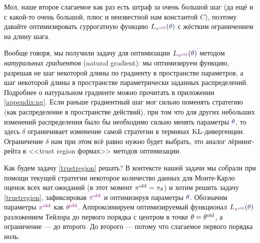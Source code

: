 Мол, наше второе слагаемое как раз есть штраф за очень большой шаг (да ещё и с какой-то очень большой, плюс и неизвестной нам константой $C$), поэтому давайте оптимизировать суррогатную функцию $L_{\textcolor{ChadPurple}{\pi^{\old}}}(\textcolor{ChadBlue}{\theta})$ с жёстким ограничением на длину шага.

Вообще говоря, мы получили задачу для оптимизации $L_{\textcolor{ChadPurple}{\pi^{\old}}}(\textcolor{ChadBlue}{\theta})$ методом \emph{натуральных градиентов} (natural gradient): мы оптимизируем функцию, разрешая не шаг некоторой длины по градиенту в пространстве параметров, а шаг некоторой длины в пространстве параметрически заданных распределений. Подробнее о натуральном градиенте можно прочитать в приложении \ref{appendix:ng}. Если раньше градиентный шаг мог сильно поменять стратегию (как распределение в пространстве действий), при том что для других небольших изменений распределения было бы необходимо сильно менять параметры $\textcolor{ChadBlue}{\theta}$, то здесь $\delta$ ограничивает изменение самой стратегии в терминах $\operatorname{KL}$-дивергенции. Ограничение $\delta$ нам при этом всё равно нужно будет выбрать, это аналог лёрнинг-рейта в <<trust region формах>> методов оптимизации.

Как будем задачу \eqref{trustregion} решать? В контексте нашей задачи мы собрали при помощи текущей стратегии некоторое количество данных для Монте-Карло оценок всех мат.ожиданий (в этот момент $\pi^{\old} \HM= \pi_\theta$) и хотим решить задачу \eqref{trustregion}, зафиксировав $\textcolor{ChadPurple}{\pi^{\old}}$ и оптимизируя параметры $\textcolor{ChadBlue}{\theta}$. Обозначим параметры $\textcolor{ChadPurple}{\pi^{\old}}$ как $\textcolor{ChadPurple}{\theta^{\old}}$. Аппроксимируем оптимизируемый функционал $L_{\textcolor{ChadPurple}{\pi^{\old}}}(\textcolor{ChadBlue}{\theta})$ разложением Тейлора до первого порядка с центром в точке $\theta = \theta^{\mathrm{old}}$, а ограничение --- до второго. До второго --- потому что слагаемое первого порядка ноль.


